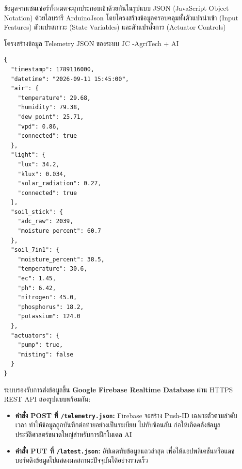ข้อมูลจากเซนเซอร์ทั้งหมดจะถูกประกอบเข้าด้วยกันในรูปแบบ JSON (JavaScript Object Notation) ด้วยไลบรารี ArduinoJson โดยโครงสร้างข้อมูลครอบคลุมทั้งตัวแปรนำเข้า (Input Features) ตัวแปรสภาวะ (State Variables) และตัวแปรสั่งการ (Actuator Controls)

\begin{definitionbox}{โครงสร้างข้อมูล Telemetry JSON ของระบบ JC -AgriTech + AI}
\begin{verbatim}
{
  "timestamp": 1789116000,
  "datetime": "2026-09-11 15:45:00",
  "air": {
    "temperature": 29.68,
    "humidity": 79.38,
    "dew_point": 25.71,
    "vpd": 0.86,
    "connected": true
  },
  "light": {
    "lux": 34.2,
    "klux": 0.034,
    "solar_radiation": 0.27,
    "connected": true
  },
  "soil_stick": {
    "adc_raw": 2039,
    "moisture_percent": 60.7
  },
  "soil_7in1": {
    "moisture_percent": 38.5,
    "temperature": 30.6,
    "ec": 1.45,
    "ph": 6.42,
    "nitrogen": 45.0,
    "phosphorus": 18.2,
    "potassium": 124.0
  },
  "actuators": {
    "pump": true,
    "misting": false
  }
}
\end{verbatim}
\end{definitionbox}

ระบบรองรับการส่งข้อมูลขึ้น \textbf{Google Firebase Realtime Database} ผ่าน HTTPS REST API สองรูปแบบพร้อมกัน:
\begin{itemize}
    \item \textbf{คำสั่ง POST ที่ \texttt{/telemetry.json}:} Firebase จะสร้าง Push-ID เฉพาะตัวตามลำดับเวลา ทำให้ข้อมูลถูกบันทึกต่อท้ายอย่างเป็นระเบียบ ไม่ทับซ้อนกัน ก่อให้เกิดคลังข้อมูลประวัติศาสตร์ขนาดใหญ่สำหรับการฝึกโมเดล AI
    \item \textbf{คำสั่ง PUT ที่ \texttt{/latest.json}:} อัปเดตทับข้อมูลแถวล่าสุด เพื่อให้แอปพลิเคชันหรือแดชบอร์ดดึงข้อมูลไปแสดงผลสถานะปัจจุบันได้อย่างรวดเร็ว
\end{itemize}
